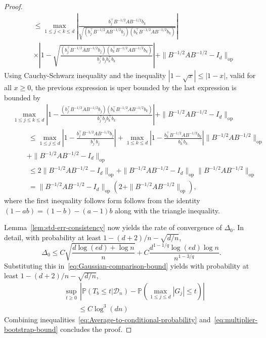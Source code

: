 \documentclass{article}
\begin{document}
\begin{appendices}
\begin{proof}
\begin{align*}
 &\le \max_{1\le j < k\le d}\left|\frac{b_j^{\top}B^{-1/2}AB^{-1/2}b_k}{\sqrt{(b_j^{\top}B^{-1/2}AB^{-1/2}b_j)(b_k^{\top}B^{-1/2}AB^{-1/2}b_k)}}\right|\\
 & \times\left|1 - \sqrt{\frac{(b_j^{\top}B^{-1/2}AB^{-1/2}b_j)(b_k^{\top}B^{-1/2}AB^{-1/2}b_k)}{b_j^{\top}b_jb_k^{\top}b_k}}\right|+ \|B^{-1/2}AB^{-1/2} - I_d\|_{\mathrm{op}}
 \end{align*}
 Using Cauchy-Schwarz inequality and the inequality $|1 - \sqrt{x}| \le |1 - x|$, valid for all $x \geq 0$, the previous expression is uper bounded by  the last expression is bounded by
 \begin{align*}
 &  \max_{1\le j \le k\le d}\left|1 - \frac{(b_j^{\top}B^{-1/2}AB^{-1/2}b_j)(b_k^{\top}B^{-1/2}AB^{-1/2}b_k)}{b_j^{\top}b_jb_k^{\top}b_k}\right| + \|B^{-1/2}AB^{-1/2} - I_d\|_{\mathrm{op}}\\
 &\qquad~ \le \max_{1\le j\le d}\left|1 - \frac{b_j^{\top}B^{-1/2}AB^{-1/2}b_j}{b_j^{\top}b_j}\right| + \max_{1\le k\le d}\left|1 - \frac{b_k^{\top}B^{-1/2}AB^{-1/2}b_k}{b_k^{\top}b_k}\right|\|B^{-1/2}AB^{-1/2}\|_{\mathrm{op}}\\ &\qquad+ \|B^{-1/2}AB^{-1/2} - I_d\|_{\mathrm{op}}\\
 &\qquad~ \le 2\|B^{-1/2}AB^{-1/2} - I_d\|_{\mathrm{op}} + \|B^{-1/2}AB^{-1/2} - I_d\|_{\mathrm{op}}\|B^{-1/2}AB^{-1/2}\|_{\mathrm{op}}\\
 &\qquad~ = \|B^{-1/2}AB^{-1/2} - I_d\|_{\mathrm{op}}\left(2 + \|B^{-1/2}AB^{-1/2}\|_{\mathrm{op}}\right),
 \end{align*}
 where the first inequality follows form follows from the identity $(1 - ab) = (1 - b) - (a-1)b$ along with the triangle inequality.
 
  Lemma~\ref{lem:std-err-consistency} now yields the rate of convergence of $\Delta_0$. In detail,  with probability at least $1 - (d+2)/n - \sqrt{d/n}$,
 \begin{equation}\label{eq:multiplier-bootstrap-bound-1}
 \Delta_0 \le C\sqrt{\frac{d\log(ed) + \log n}{n}} + C\frac{d^{1-1/q}\log(ed)\log n}{n^{1-3/q}}.
 \end{equation}
 Substituting this in~\eqref{eq:Gaussian-comparison-bound} yields with probability at least $1 - (d + 2)/n - \sqrt{d/n}$,
 \begin{equation}\label{eq:multiplier-bootstrap-bound}
 \begin{split}
 &\sup_{t\ge 0}\,\left|\mathbb{P}(T_b \le t\big|\mathcal{D}_n) - \mathbb{P}\left(\max_{1\le j\le d}|G_j| \le t\right)\right|\\ 
 &\qquad\le C\log^3(dn)\left.
 \end{split}
 \end{equation}
 Combining inequalities~\eqref{eq:Average-to-conditional-probability} and~\eqref{eq:multiplier-bootstrap-bound} concludes the proof.
 \end{proof}
 
 
 
 
 
 
 \end{appendices}
 
\end{document}
